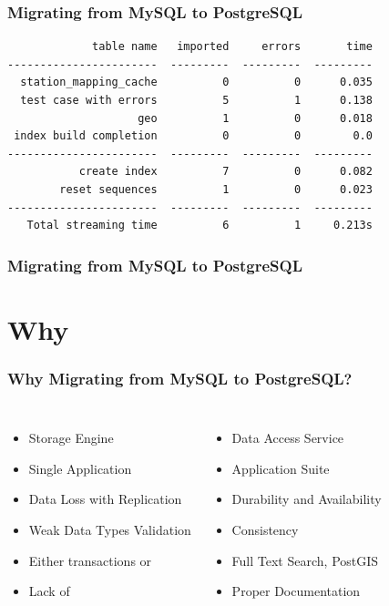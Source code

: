 \documentclass{beamer}
\begin{document}
\begin{frame}[fragile]
  \frametitle{Migrating from MySQL to PostgreSQL}
  
  \vfill

\begin{verbatim}
             table name   imported     errors       time
-----------------------  ---------  ---------  ---------
  station_mapping_cache          0          0      0.035
  test case with errors          5          1      0.138
                    geo          1          0      0.018
 index build completion          0          0        0.0
-----------------------  ---------  ---------  ---------
           create index          7          0      0.082
        reset sequences          1          0      0.023
-----------------------  ---------  ---------  ---------
   Total streaming time          6          1     0.213s
\end{verbatim}
\end{frame}

\begin{frame}[fragile]
  \frametitle{Migrating from MySQL to PostgreSQL}
  
  \vfill
\end{frame}

\section{Why}

\begin{frame}[fragile]
  \frametitle{Why Migrating from MySQL to PostgreSQL?}
  
\begin{columns}[c]

  \vfill

  \begin{itemize}
  \item Storage Engine
  \item Single Application
  \item Data Loss with Replication
  \item Weak Data Types Validation
  \item Either transactions or
  \item Lack of
  \end{itemize}


  \vfill

  \begin{itemize}
  \item Data Access Service
  \item Application Suite
  \item Durability and Availability
  \item Consistency
  \item Full Text Search, PostGIS
  \item Proper Documentation
  \end{itemize}
\end{columns}
\end{frame}
\end{document}
